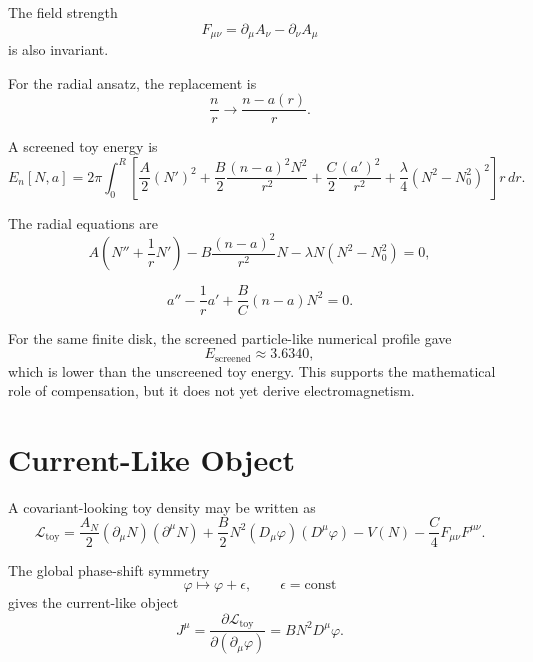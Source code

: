 \documentclass[11pt,a4paper]{article}
\newcommand{\phase}{\varphi}
\begin{document}
The field strength
\begin{equation}
F_{\mu\nu}=\partial_\mu A_\nu-\partial_\nu A_\mu
\end{equation}
is also invariant.

For the radial ansatz, the replacement is
\begin{equation}
\frac{n}{r}\longrightarrow\frac{n-a(r)}{r}.
\end{equation}

A screened toy energy is
\begin{equation}
E_n[N,a]
=2\pi\int_0^R
\left[
\frac{A}{2}(N')^2
+\frac{B}{2}\frac{(n-a)^2N^2}{r^2}
+\frac{C}{2}\frac{(a')^2}{r^2}
+\frac{\lambda}{4}(N^2-N_0^2)^2
\right]r\,dr.
\end{equation}

The radial equations are
\begin{equation}
A\left(N''+\frac{1}{r}N'\right)
-B\frac{(n-a)^2}{r^2}N
-\lambda N(N^2-N_0^2)=0,
\end{equation}

\begin{equation}
a''-\frac{1}{r}a'
+\frac{B}{C}(n-a)N^2=0.
\end{equation}

For the same finite disk, the screened particle-like numerical profile gave
\begin{equation}
E_{\mathrm{screened}}\approx 3.6340,
\end{equation}
which is lower than the unscreened toy energy. This supports the mathematical role of compensation, but it does not yet derive electromagnetism.

\section{Current-Like Object}

A covariant-looking toy density may be written as
\begin{equation}
\mathcal{L}_{\mathrm{toy}}
=\frac{A_N}{2}(\partial_\mu N)(\partial^\mu N)
+\frac{B}{2}N^2(D_\mu\phase)(D^\mu\phase)
-V(N)
-\frac{C}{4}F_{\mu\nu}F^{\mu\nu}.
\end{equation}

The global phase-shift symmetry
\begin{equation}
\phase\mapsto\phase+\epsilon, \qquad \epsilon=\mathrm{const}
\end{equation}
gives the current-like object
\begin{equation}
J^\mu=\frac{\partial\mathcal{L}_{\mathrm{toy}}}{\partial(\partial_\mu\phase)}
=BN^2D^\mu\phase.
\end{equation}
\end{document}
